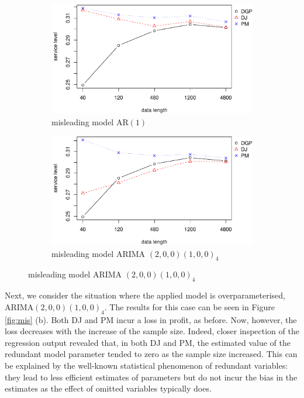 \documentclass{article}
\begin{document}
\begin{figure}
\centering
\caption{Service level vs. data size in misleading model}
\begin{subfigure}[b]{0.48\textwidth}
\centering
\includegraphics[width=\textwidth]{information-plot_files/figure-latex/AR(1)sl-1.pdf}
\caption{misleading model AR$(1)$}
\end{subfigure}
\hfill
\begin{subfigure}[b]{0.48\textwidth}
\centering
\includegraphics[width=\textwidth]{information-plot_files/figure-latex/SAR(3)(1)_4sl-1.pdf}
\caption{misleading model ARIMA $(2,0,0)(1,0,0)_4$}
\end{subfigure}
\label{fig:mis_sl}
\end{figure}

Next, we consider the situation where the applied model is overparameterised, ARIMA$(2,0,0)(1,0,0)_4$. The results for this case can be seen in Figure \ref{fig:mis} (b). Both DJ and PM incur a loss in profit, as before. Now, however, the loss decreases with the increase of the sample size. Indeed, closer inspection of the regression output revealed that, in both DJ and PM, the estimated value of the redundant model parameter tended to zero as the sample size increased. This can be explained by the well-known statistical phenomenon of redundant variables: they lead to less efficient estimates of parameters but do not incur the bias in the estimates as the effect of omitted variables typically does.
\end{document}
